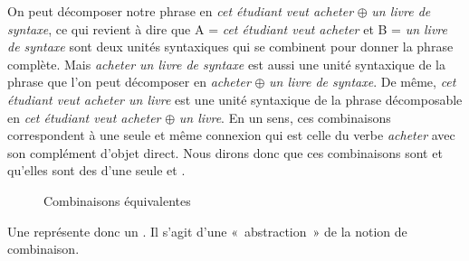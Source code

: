 On peut décomposer notre phrase en \textit{cet étudiant veut acheter} ${\oplus}$ \textit{un livre de syntaxe}, ce qui revient à dire que A = \textit{cet étudiant veut acheter} et B = \textit{un livre de syntaxe} sont deux unités syntaxiques qui se combinent pour donner la phrase complète. Mais \textit{acheter un livre de syntaxe} est aussi une unité syntaxique de la phrase que l’on peut décomposer en \textit{acheter} ${\oplus}$ \textit{un livre de syntaxe}. De même, \textit{cet étudiant veut acheter un livre} est une unité syntaxique de la phrase décomposable en \textit{cet étudiant veut acheter} ${\oplus}$ \textit{un livre}. En un sens, ces combinaisons correspondent à une seule et même connexion qui est celle du verbe \textit{acheter} avec son complément d’objet direct. Nous dirons donc que ces combinaisons sont  et qu’elles sont des  d’une seule et . 

\begin{figure}\label{fig:combiequiv}
\caption{\label{fig:}Combinaisons équivalentes}
\end{figure}

{Une  représente donc un . Il s’agit d’une «~abstraction~» de la notion de combinaison.}

